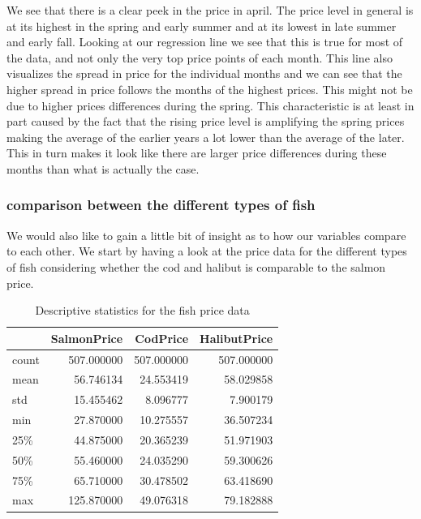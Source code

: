 We see that there is a clear peek in the price in april. The price level in general is at its highest in the spring and early summer and at its lowest in late summer and early fall. Looking at our regression line we see that this is true for most of the data, and not only the very top price points of each month. This line also visualizes the spread in price for the individual months and we can see that the higher spread in price follows the months of the highest prices. This might not be due to higher prices differences during the spring. This characteristic is at least in part caused by the fact that the rising price level is amplifying the spring prices making the average of the earlier years a lot lower than the average of the later. This in turn makes it look like there are larger price differences during these months than what is actually the case.

\subsubsection {comparison between the different types of fish}\label{comparison between the different types of fish}
We would also like to gain a little bit of insight as to how our variables compare to each other. We start by having a look at the price data for the different types of fish considering whether the cod and halibut is comparable to the salmon price.

\begin{table}[H]
    \begin{center}
    \begin{tabular}{lrrr}
        \toprule
        {} &  SalmonPrice &    CodPrice &  HalibutPrice \\
        \midrule
        count &   507.000000 &  507.000000 &    507.000000 \\
        mean  &    56.746134 &   24.553419 &     58.029858 \\
        std   &    15.455462 &    8.096777 &      7.900179 \\
        min   &    27.870000 &   10.275557 &     36.507234 \\
        25\%   &    44.875000 &   20.365239 &     51.971903 \\
        50\%   &    55.460000 &   24.035290 &     59.300626 \\
        75\%   &    65.710000 &   30.478502 &     63.418690 \\
        max   &   125.870000 &   49.076318 &     79.182888 \\
        \bottomrule
    \end{tabular}
    \end{center}
    \caption{Descriptive statistics for the fish price data}
\end{table}

